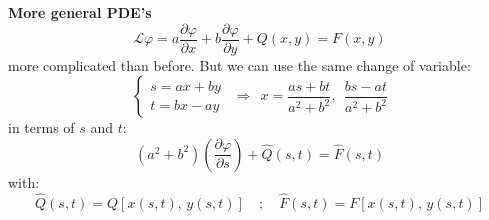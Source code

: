 \documentclass{article}
\begin{document}
\noindent
\textbf{More general PDE’s}
\begin{equation}
    \mathcal{L} \varphi = a \frac{\partial \varphi}{\partial x} + b \frac{\partial \varphi}{\partial y} + Q(x, y) = F(x, y)
\end{equation}
more complicated than before. But we can use the same change of variable:
\begin{equation}
    \begin{cases}
        s = ax + by \\ t = bx-ay
    \end{cases} \ \ \Rightarrow \ \ x = \frac{as + bt}{a^2 + b^2}, \ \ \frac{bs-at}{a^2 + b^2}
\end{equation}
in terms of $s$ and $t$:
\begin{equation}
    \left( a^2 + b^2 \right) \left( \frac{\partial \varphi}{\partial s} \right)
+ \hat{Q}(s, t) = \hat{F}(s, t)
\end{equation}
with:
\begin{equation}
    \hat{Q}(s, t) = Q\left[ x(s, t),\, y(s, t) \right]
\quad ; \quad
\hat{F}(s, t) = F\left[ x(s, t),\, y(s, t) \right]
\end{equation}
\end{document}
